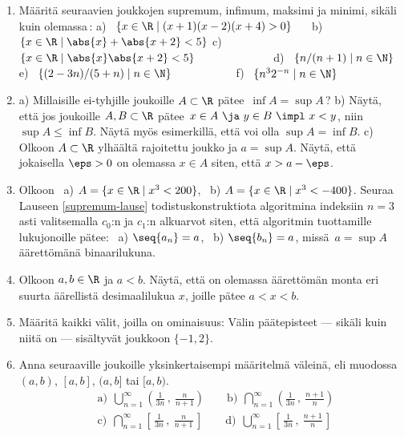 \pagebreak
\Harj
\begin{enumerate}



\item
Määritä seuraavien joukkojen supremum, infimum, maksimi ja minimi, sikäli kuin olemassa\,: 
\newline
a) \ $\{x\in\R \mid (x+1)(x-2)(x+4)>0\}\quad\ $ 
b) \ $\{x\in\R \mid \abs{x}+\abs{x+2}<5\}$ \newline
c) \ $\{x\in\R \mid \abs{x}\abs{x+2}<5\}\qquad\qquad\qquad\ \ $ 
d) \ $\{n/(n+1) \mid n\in\N\}$ \newline 
e) \ $\{(2-3n)/(5+n) \mid n\in\N\}\qquad\qquad\quad\ $
f) \ $\{n^3 2^{-n} \mid n\in\N\}$

\item
a) Millaisille ei-tyhjille joukoille $A\subset\R$ pätee $\,\inf A = \sup A$\,? \newline
b) Näytä, että jos joukoille $A,B\subset\R$ pätee $\,x \in A\ \ja\ y \in B\ \impl\ x<y$, 
niin $\sup A \le \inf B$. Näytä myös esimerkillä, että voi olla $\sup A = \inf B$. \newline
c) Olkoon $A\subset\R$ ylhäältä rajoitettu joukko ja $a=\sup A$. Näytä, että jokaisella
$\eps>0$ on olemassa $x \in A$ siten, että $x > a-\eps$.

\item
Olkoon \ a) $A=\{x\in\R \mid x^3<200\}$, \ b) $A=\{x\in\R \mid x^3<-400\}$. Seuraa Lauseen
\ref{supremum-lause} todistuskonstruktiota algoritmina indeksiin $n=3$ asti valitsemalla 
$c_0$:n ja $c_1$:n alkuarvot siten, että algoritmin tuottamille lukujonoille pätee: \ 
a) $\seq{a_n}=a$, \ b) $\seq{b_n}=a$, missä $\,a=\sup A\,$ äärettömänä binaarilukuna.

\item \label{H-I-11: rationaaliluvut välillä}
Olkoon $a,b\in\R$ ja $a<b$. Näytä, että on olemassa äärettömän monta eri suurta äärellistä 
desimaalilukua $x$, joille pätee $a<x<b$.

\item
Määritä kaikki välit, joilla on ominaisuus: Välin päätepisteet --- sikäli kuin niitä on --- 
sisältyvät joukkoon $\{-1,2\}$.

\item
Anna seuraaville joukoille yksinkertaisempi määritelmä väleinä, eli muodossa $(a,b)$, $[a,b]$,
$(a,b]$ tai $[a,b)$.
\begin{align*}
&\text{a)}\ \ \bigcup_{n=1}^\infty \left(\frac{1}{3n}\,,\ \frac{n}{n+1}\right) \qquad
 \text{b)}\ \ \bigcap_{n=1}^\infty \left(\frac{1}{3n}\,,\ \frac{n+1}{n}\right) \\
&\text{c)}\ \ \bigcap_{n=1}^\infty \left[\,\frac{1}{3n}\,,\ \frac{n}{n+1}\,\right] \qquad
 \text{d)}\ \ \bigcup_{n=1}^\infty \left[\,\frac{1}{3n}\,,\ \frac{n+1}{n}\,\right]
\end{align*}


\end{enumerate}
